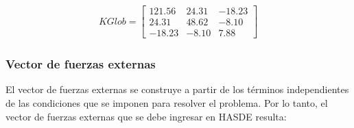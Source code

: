 \begin{eqnarray}
	KGlob = \left[
	\begin{array}{lll}
	121.56 & 24.31 & -18.23 \\
	24.31 & 48.62 & -8.10 \\
	-18.23 & -8.10 & 7.88	
	\end{array}
	\right]
\end{eqnarray}

\subsubsection{Vector de fuerzas externas}

El vector de fuerzas externas se construye a partir de los términos independientes de las condiciones que se imponen para resolver el problema. Por lo tanto, el vector de fuerzas externas que se debe ingresar en HASDE resulta:



